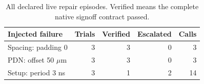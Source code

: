 \begin{table}[htbp]\centering\small\setlength{\tabcolsep}{4pt}
\caption{All declared live repair episodes. Verified means the complete native signoff contract passed.}\label{tab:repairs}
\begin{tabular}{@{}lrrrr@{}}\toprule
Injected failure & Trials & Verified & Escalated & Calls \\
\midrule
Spacing: padding 0 & 3 & 3 & 0 & 3 \\
PDN: offset 50 $\mu$m & 3 & 3 & 0 & 3 \\
Setup: period 3 ns & 3 & 1 & 2 & 14 \\
\bottomrule\end{tabular}\end{table}
